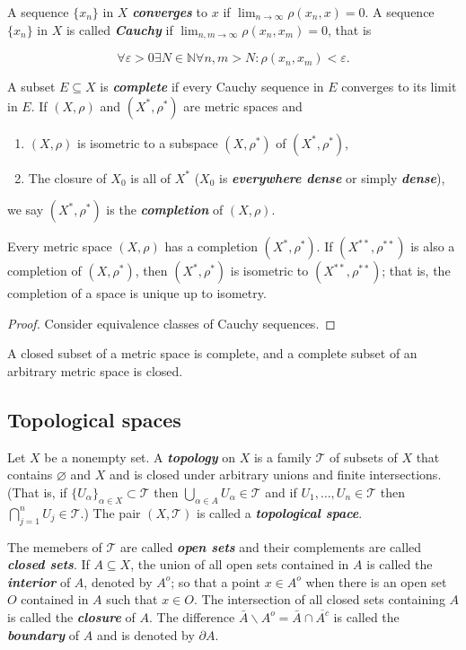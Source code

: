 \documentclass{article}
\theoremstyle{definition}
\numberwithin{equation}{section}
\newcommand{\N}{\mathbb{N}}
\begin{document}
	A sequence $\{x_n\}$ in $X$ \textbf{\textit{converges}} to $x$ if $\lim_{n\to\infty}\rho(x_n,x)=0$. A sequence $\{x_n\}$ in $X$ is called \textbf{\textit{Cauchy}} if $\lim_{n,m\to\infty}\rho(x_n,x_m)=0$, that is
	
	\[\forall\varepsilon>0\exists N\in\N\forall n,m>N:\rho(x_n,x_m)<\varepsilon.\]
	
	A subset $E\subseteq X$ is \textbf{\textit{complete}} if every Cauchy sequence in $E$ converges to its limit in $E$. If $(X,\rho)$ and $(X^*,\rho^*)$ are metric spaces and
	\begin{enumerate}
		\item $(X,\rho)$ is isometric to a subspace $(X,\rho^*)$ of $(X^*,\rho^*)$,
		\item The closure of $X_0$ is all of $X^*$ ($X_0$ is \textbf{\textit{everywhere dense}} or simply \textbf{\textit{dense}}),
	\end{enumerate}
	we say $(X^*,\rho^*)$ is the \textbf{\textit{completion}} of $(X,\rho)$.
	\begin{thm}
		Every metric space $(X,\rho)$ has a completion $(X^*,\rho^*)$. If $(X^{**},\rho^{**})$ is also a completion of $(X,\rho^*)$, then $(X^*,\rho^*)$ is isometric to $(X^{**},\rho^{**})$; that is, the completion of a space is unique up to isometry.
	\end{thm}
	\begin{proof}
		Consider equivalence classes of Cauchy sequences.
	\end{proof}
	
	\begin{prop}
		A closed subset of a metric space is complete, and a complete subset of an arbitrary metric space is closed.
	\end{prop}
	
	\subsection{Topological spaces}
	Let $X$ be a nonempty set. A \textbf{\textit{topology}} on $X$ is a family $\mathcal{T}$ of subsets of $X$ that contains $\varnothing$ and $X$ and is closed under arbitrary unions and finite intersections. (That is, if $\{U_\alpha\}_{\alpha\in X}\subset\mathcal{T}$ then $\bigcup_{\alpha\in A}U_\alpha\in\mathcal{T}$ and if $U_1,\ldots, U_n\in\mathcal{T}$ then $\bigcap_{j=1}^nU_j\in\mathcal{T}$.) The pair $(X,\mathcal{T})$ is called a \textbf{\textit{topological space}}.
	
	The memebers of $\mathcal{T}$ are called \textbf{\textit{open sets}} and their complements are called \textbf{\textit{closed sets}}. If $A\subseteq X$, the union of all open sets contained in $A$ is called the \textbf{\textit{interior}} of $A$, denoted by $A^o$; so that a point $x\in A^o$ when there is an open set $O$ contained in $A$ such that $x\in O$. The intersection of all closed sets containing $A$ is called the \textbf{\textit{closure}} of $A$. The difference $\bar{A}\backslash A^o=\bar{A}\cap\overline{A^c}$ is called the \textbf{\textit{boundary}} of $A$ and is denoted by $\partial A$.
	
\end{document}
